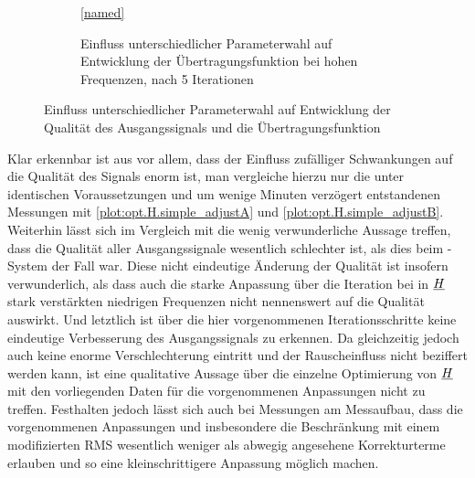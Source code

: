 \documentclass[../Report.tex]{subfiles}
\begin{document}
\begin{figure}[H]
\begin{center}
\begin{subfigure}{\textwidth}
\ref{named}
	\caption{Einfluss unterschiedlicher Parameterwahl auf Entwicklung der Übertragungsfunktion bei hohen Frequenzen, nach 5 Iterationen}
	\label{subfig:opt.H.paramHoverview}
	\end{subfigure}
\caption{Einfluss unterschiedlicher Parameterwahl auf Entwicklung der Qualität des Ausgangssignals und die Übertragungsfunktion}
\label{fig:opt.H.parameter}
\end{center}
\end{figure}


Klar erkennbar ist aus  vor allem, dass der Einfluss zufälliger Schwankungen auf die Qualität des Signals enorm ist, man vergleiche hierzu nur die unter identischen Voraussetzungen und um wenige Minuten verzögert entstandenen Messungen mit \ref{plot:opt.H.simple_adjustA} und \ref{plot:opt.H.simple_adjustB}. 
Weiterhin lässt sich im Vergleich mit   die wenig verwunderliche Aussage treffen, dass die Qualität aller Ausgangssignale wesentlich schlechter ist, als dies beim \mock-System der Fall war. 
Diese nicht eindeutige Änderung der Qualität ist insofern verwunderlich, als dass auch die starke Anpassung über die Iteration bei in $\underline{H}$ stark verstärkten niedrigen Frequenzen nicht nennenswert auf die Qualität auswirkt.
Und letztlich ist über die hier vorgenommenen Iterationsschritte keine eindeutige Verbesserung des Ausgangssignals zu erkennen. Da gleichzeitig jedoch auch keine enorme Verschlechterung eintritt und der Rauscheinfluss nicht beziffert werden kann, ist eine qualitative Aussage über die einzelne Optimierung von $\underline{H}$ mit den vorliegenden Daten für die vorgenommenen Anpassungen nicht zu treffen.
Festhalten jedoch lässt sich auch bei Messungen am Messaufbau, dass die vorgenommenen Anpassungen und insbesondere die Beschränkung mit einem modifizierten RMS wesentlich weniger als abwegig angesehene Korrekturterme erlauben und so eine kleinschrittigere Anpassung möglich machen. 
\end{document}
